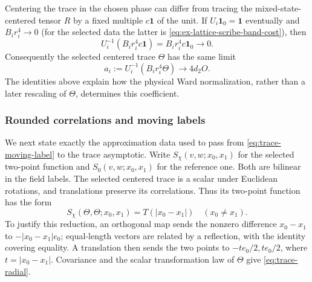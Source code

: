 Centering the trace in the chosen phase can differ from tracing the
mixed-state-centered tensor $R$ by a fixed multiple $c\mathbf1$ of the
unit. If $U_i\mathbf1_0=\mathbf1$ eventually and $B_ir_i^4\to0$
(for the selected data the latter is
\eqref{eq:ex-lattice-scribe-band-cost}), then
\[
 U_i^{-1}(B_ir_i^4c\mathbf1)=B_ir_i^4c\mathbf1_0\longrightarrow0.
\]
Consequently the selected centered trace $\Theta$ has the same limit
\begin{equation}\label{eq:trace-moving-label}
 a_i:=U_i^{-1}(B_ir_i^4\Theta)\longrightarrow4d_2O.
\end{equation}
The identities above explain how the physical Ward normalization, rather
than a later rescaling of $\Theta$, determines this coefficient.

\subsubsection{Rounded correlations and moving labels}
We next state exactly the approximation data used to pass from
\eqref{eq:trace-moving-label} to the trace asymptotic. Write
$S_\chi(v,w;x_0,x_1)$ for the selected two-point function and
$S_0(v,w;x_0,x_1)$ for the reference one. Both are bilinear in the field
labels. The selected centered trace is a scalar under Euclidean rotations,
and translations preserve its correlations. Thus its two-point function
has the form
\begin{equation}\label{eq:trace-radial}
 S_\chi(\Theta,\Theta;x_0,x_1)=T(|x_0-x_1|)
       \quad(x_0\neq x_1).
\end{equation}
To justify this reduction, an orthogonal map sends the nonzero difference
$x_0-x_1$ to $-|x_0-x_1|e_0$; equal-length vectors are related by a
reflection, with the identity covering equality. A translation then sends
the two points to $-te_0/2,te_0/2$, where $t=|x_0-x_1|$.
Covariance and the scalar transformation law of $\Theta$ give
\eqref{eq:trace-radial}.

